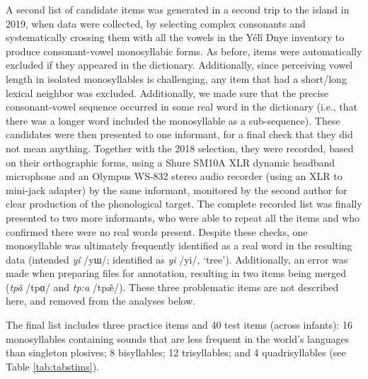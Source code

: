 \documentclass[
  english,
  ,man,floatsintext]{apa6}
\begin{document}
A second list of candidate items was generated in a second trip to the island in 2019, when data were collected, by selecting complex consonants and systematically crossing them with all the vowels in the Yélî Dnye inventory to produce consonant-vowel monosyllabic forms. As before, items were automatically excluded if they appeared in the dictionary. Additionally, since perceiving vowel length in isolated monosyllables is challenging, any item that had a short/long lexical neighbor was excluded. Additionally, we made sure that the precise consonant-vowel sequence occurred in some real word in the dictionary (i.e., that there was a longer word included the monosyllable as a sub-sequence). These candidates were then presented to one informant, for a final check that they did not mean anything. Together with the 2018 selection, they were recorded, based on their orthographic forms, using a Shure SM10A XLR dynamic headband microphone and an Olympus WS-832 stereo audio recorder (using an XLR to mini-jack adapter) by the same informant, monitored by the second author for clear production of the phonological target. The complete recorded list was finally presented to two more informants, who were able to repeat all the items and who confirmed there were no real words present. Despite these checks, one monosyllable was ultimately frequently identified as a real word in the resulting data (intended \emph{yî} /yɯ/; identified as \emph{yi} /yi/, `tree'). Additionally, an error was made when preparing files for annotation, resulting in two items being merged (\emph{tpâ} /tpɑ/ and \emph{tp:a} /tpæ̃/). These three problematic items are not described here, and removed from the analyses below.

The final list includes three practice items and 40 test items (across infants): 16 monosyllables containing sounds that are less frequent in the world's languages than singleton plosives; 8 bisyllables; 12 trisyllables; and 4 quadrisyllables (see Table \ref{tab:tabstims}).
\end{document}
